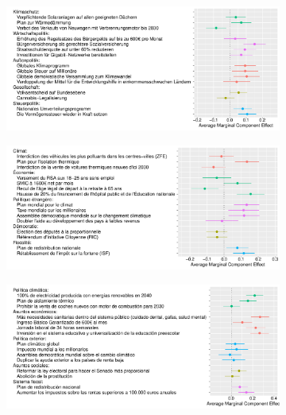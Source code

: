\begin{figure}[h] 
  \cprotect\caption[Preferences for various policies in political platforms (original)]{Effects of the presence of a policy (rather than none from this domain) in a random platform on the likelihood that it is preferred to another random platform. Points represent Average Marginal Component Effects and bars 95\% C.I. (\verb|[country]/ca_r|; See English translations in Figure \ref{fig:ca_r}; Question \ref{q:conjoint_r}%
  )}\label{fig:ca_r_en}
    \begin{subfigure}{.97\textwidth}
      \includegraphics[width=.97\textwidth]{../figures/DE/ca_r.pdf}
    \end{subfigure}
    \begin{subfigure}{.98\textwidth}
      \includegraphics[width=.98\textwidth]{../figures/FR/ca_r.pdf}
    \end{subfigure}
    \begin{subfigure}{.98\textwidth}
      \includegraphics[width=.98\textwidth]{../figures/ES/ca_r.pdf}
    \end{subfigure}
\end{figure}

